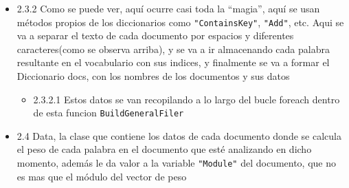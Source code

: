 \begin{enumerate}
\begin{Shaded}
\begin{Highlighting}[]
\OperatorTok{(}\OperatorTok{,} \OperatorTok{);}
            \OperatorTok{\}}
        \OperatorTok{\}}
\OperatorTok{[}\OperatorTok{].}\OperatorTok{(}\OperatorTok{);}
         \OperatorTok{(}\OperatorTok{[}\OperatorTok{].} \OperatorTok{\textgreater{}}\OperatorTok{)\{}
 \OperatorTok{=}\OperatorTok{[}\OperatorTok{].}\OperatorTok{;}
        \OperatorTok{\}}
\OperatorTok{++;}
    \OperatorTok{\}}
\OperatorTok{(}\OperatorTok{,}\OperatorTok{);}
\OperatorTok{\}}
\end{Highlighting}
\end{Shaded}

  \begin{itemize}
  \tightlist
  \item
    2.3.2 Como se puede ver, aquí ocurre casi toda la ``magia'', aquí se
    usan métodos propios de los diccionarios como
    \texttt{"ContainsKey"}, \texttt{"Add"}, etc. Aqui se va a separar el
    texto de cada documento por espacios y diferentes caracteres(como se
    observa arriba), y se va a ir almacenando cada palabra resultante en
    el vocabulario con sus indices, y finalmente se va a formar el
    Diccionario docs, con los nombres de los documentos y sus datos

    \begin{itemize}
    \tightlist
    \item
      2.3.2.1 Estos datos se van recopilando a lo largo del bucle
      foreach dentro de esta funcion \texttt{BuildGeneralFiler}
    \end{itemize}
  \item
    2.4 Data, la clase que contiene los datos de cada documento donde se
    calcula el peso de cada palabra en el documento que esté analizando
    en dicho momento, además le da valor a la variable \texttt{"Module"}
    del documento, que no es mas que el módulo del vector de peso
  \end{itemize}


\end{enumerate}
